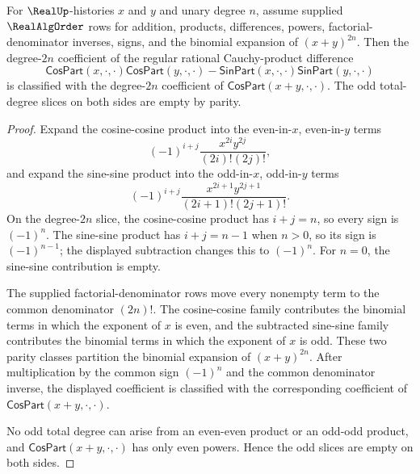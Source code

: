 \begin{lemma}
\label{lem:real-analytic-even-trig-cauchy-product-split}
For $\RealUp$-histories $x$ and $y$ and unary degree $n$, assume supplied $\RealAlgOrder$ rows for addition, products, differences, powers, factorial-denominator inverses, signs, and the binomial expansion of $(x+y)^{2n}$. Then the degree-$2n$ coefficient of the regular rational Cauchy-product difference
$$
\mathsf{CosPart}(x,\cdot,\cdot)\mathsf{CosPart}(y,\cdot,\cdot)
-
\mathsf{SinPart}(x,\cdot,\cdot)\mathsf{SinPart}(y,\cdot,\cdot)
$$
is classified with the degree-$2n$ coefficient of $\mathsf{CosPart}(x+y,\cdot,\cdot)$. The odd total-degree slices on both sides are empty by parity.
\end{lemma}
\begin{proof}
Expand the cosine-cosine product into the even-in-$x$, even-in-$y$ terms
$$
(-1)^{i+j}\frac{x^{2i}y^{2j}}{(2i)!(2j)!},
$$
and expand the sine-sine product into the odd-in-$x$, odd-in-$y$ terms
$$
(-1)^{i+j}\frac{x^{2i+1}y^{2j+1}}{(2i+1)!(2j+1)!}.
$$
On the degree-$2n$ slice, the cosine-cosine product has $i+j=n$, so every sign is $(-1)^n$. The sine-sine product has $i+j=n-1$ when $n>0$, so its sign is $(-1)^{n-1}$; the displayed subtraction changes this to $(-1)^n$. For $n=0$, the sine-sine contribution is empty.

The supplied factorial-denominator rows move every nonempty term to the common denominator $(2n)!$. The cosine-cosine family contributes the binomial terms in which the exponent of $x$ is even, and the subtracted sine-sine family contributes the binomial terms in which the exponent of $x$ is odd. These two parity classes partition the binomial expansion of $(x+y)^{2n}$. After multiplication by the common sign $(-1)^n$ and the common denominator inverse, the displayed coefficient is classified with the corresponding coefficient of $\mathsf{CosPart}(x+y,\cdot,\cdot)$.

No odd total degree can arise from an even-even product or an odd-odd product, and $\mathsf{CosPart}(x+y,\cdot,\cdot)$ has only even powers. Hence the odd slices are empty on both sides.
\end{proof}

